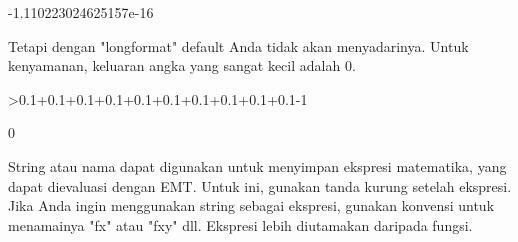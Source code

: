 \documentclass{article}
\begin{document}
\begin{eulernotebook}
\begin{euleroutput}
   -1.110223024625157e-16 
\end{euleroutput}
\begin{eulercomment}
Tetapi dengan "longformat" default Anda tidak akan menyadarinya. Untuk
kenyamanan, keluaran angka yang sangat kecil adalah 0.
\end{eulercomment}
\begin{eulerprompt}
>0.1+0.1+0.1+0.1+0.1+0.1+0.1+0.1+0.1+0.1-1
\end{eulerprompt}
\begin{euleroutput}
  0
\end{euleroutput}
\begin{eulercomment}
String atau nama dapat digunakan untuk menyimpan ekspresi matematika,
yang dapat dievaluasi dengan EMT. Untuk ini, gunakan tanda kurung
setelah ekspresi. Jika Anda ingin menggunakan string sebagai ekspresi,
gunakan konvensi untuk menamainya "fx" atau "fxy" dll. Ekspresi lebih
diutamakan daripada fungsi.


\end{eulercomment}
\end{eulernotebook}
\end{document}
